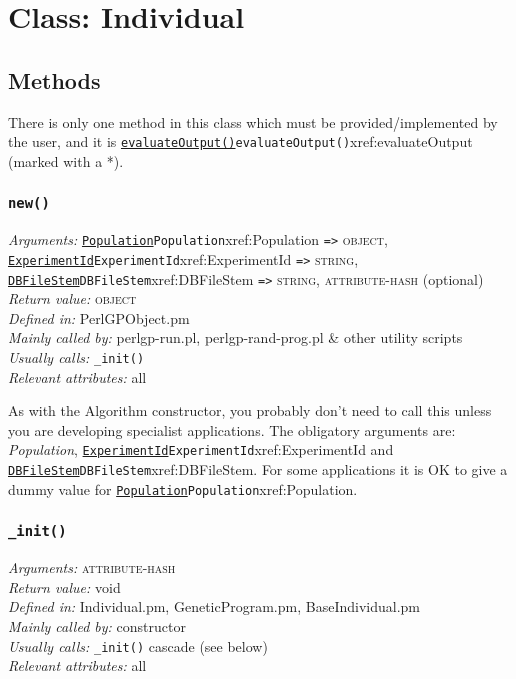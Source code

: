 \documentclass[a4paper]{article}
\begin{document}
\section{Class: Individual}\label{Individual}
\subsection{Methods}

There is only one method in this class which must be
provided/implemented by the user, and it is \hyperref[no]{\texttt{evaluateOutput()}}{\texttt{evaluateOutput()}}{xref:evaluateOutput}
(marked with a *).

\subsubsection{\texttt{new()}}\label{Individual::new}
\begin{flushleft}
\textit{Arguments:} \hyperref[no]{\texttt{Population}}{\texttt{Population}}{xref:Population} \verb:=>: \textsc{object}, \hyperref[no]{\texttt{ExperimentId}}{\texttt{ExperimentId}}{xref:ExperimentId} \verb:=>: \textsc{string}, \hyperref[no]{\texttt{DBFileStem}}{\texttt{DBFileStem}}{xref:DBFileStem} \verb:=>: \textsc{string}, \textsc{attribute-hash} (optional)\\
\textit{Return value:} \textsc{object}\\
\textit{Defined in:} PerlGPObject.pm\\
\textit{Mainly called by:} perlgp-run.pl, perlgp-rand-prog.pl \& other utility scripts\\
\textit{Usually calls:} \texttt{\_init()}\\
\textit{Relevant attributes:} all
\end{flushleft}

As with the Algorithm constructor, you probably don't need to call
this unless you are developing specialist applications.  The
obligatory arguments are: \textit{Population}, \hyperref[no]{\texttt{ExperimentId}}{\texttt{ExperimentId}}{xref:ExperimentId}
and \hyperref[no]{\texttt{DBFileStem}}{\texttt{DBFileStem}}{xref:DBFileStem}.  For some applications it is OK to give a
dummy value for \hyperref[no]{\texttt{Population}}{\texttt{Population}}{xref:Population}.

\subsubsection{\texttt{\_init()}}\label{Individual::_init}
\begin{flushleft}
\textit{Arguments:} \textsc{attribute-hash}\\
\textit{Return value:} void\\
\textit{Defined in:} Individual.pm, GeneticProgram.pm, BaseIndividual.pm\\
\textit{Mainly called by:} constructor\\
\textit{Usually calls:} \texttt{\_init()} cascade (see below)\\
\textit{Relevant attributes:} all
\end{flushleft}
\end{document}
